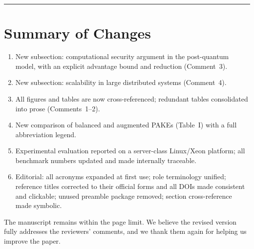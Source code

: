 \documentclass[11pt,a4paper]{article}
\begin{document}
\bigskip
\hrule
\section*{Summary of Changes}
\begin{enumerate}
  \item New subsection: computational security argument in the post-quantum model, with an explicit advantage bound and reduction (Comment~3).
  \item New subsection: scalability in large distributed systems (Comment~4).
  \item All figures and tables are now cross-referenced; redundant tables consolidated into prose (Comments~1--2).
  \item New comparison of balanced and augmented PAKEs (Table~I) with a full abbreviation legend.
  \item Experimental evaluation reported on a server-class Linux/Xeon platform; all benchmark numbers updated and made internally traceable.
  \item Editorial: all acronyms expanded at first use; role terminology unified; reference titles corrected to their official forms and all DOIs made consistent and clickable; unused preamble package removed; section cross-reference made symbolic.
\end{enumerate}

\medskip
\noindent The manuscript remains within the page limit. We believe the revised version fully addresses the reviewers' comments, and we thank them again for helping us improve the paper.
\end{document}
